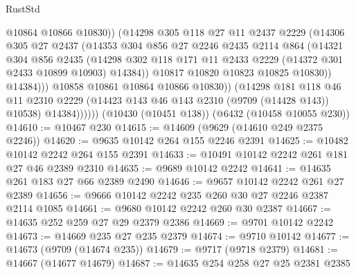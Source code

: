 \begin{lexlean}{RustStd}
\begin{coremodule}
                          @10864
                          @10866
                          @10830))
                      (@14298
                        @305
                        @118
                        @27
                        @11
                        @2437
                        @2229
                        (@14306
                          @305
                          @27
                          @2437
                          (@14353
                            @304
                            @856
                            @27
                            @2246
                            @2435
                            @2114
                            @864
                            (@14321
                              @304
                              @856
                              @2435
                              (@14298
                                @302
                                @118
                                @171
                                @11
                                @2433
                                @2229
                                (@14372 @301 @2433 @10899 @10903)
                                @14384))
                            @10817
                            @10820
                            @10823
                            @10825
                            @10830))
                        @14384)))
                  @10858
                  @10861
                  @10864
                  @10866
                  @10830))
              (@14298
                @181
                @118
                @46
                @11
                @2310
                @2229
                (@14423 @143 @46 @143 @2310 (@9709 (@14428 @143)) @10538)
                @14384))))))
    (@10430 (@10451 @138))
    (@6432 (@10458 @10055 @230))
@14610 := @10467 @230
@14615 := @14609 (@9629 (@14610 @249 @2375 @2246))
@14620 := @9635 @10142 @264 @155 @2246 @2391
@14625 := @10482 @10142 @2242 @264 @155 @2391
@14633 := @10491 @10142 @2242 @261 @181 @27 @46 @2389 @2310
@14635 := @9689 @10142 @2242
@14641 := @14635 @261 @183 @27 @66 @2389 @2490
@14646 := @9657 @10142 @2242 @261 @27 @2389
@14656 := @9666 @10142 @2242 @235 @260 @30 @27 @2246 @2387 @2114 @1085
@14661 := @9680 @10142 @2242 @260 @30 @2387
@14667 := @14635 @252 @259 @27 @29 @2379 @2386
@14669 := @9701 @10142 @2242
@14673 := @14669 @235 @27 @235 @2379
@14674 := @9710 @10142
@14677 := @14673 (@9709 (@14674 @235))
@14679 := @9717 (@9718 @2379)
@14681 := @14667 (@14677 @14679)
@14687 := @14635 @254 @258 @27 @25 @2381 @2385

\end{coremodule}
\end{lexlean}
